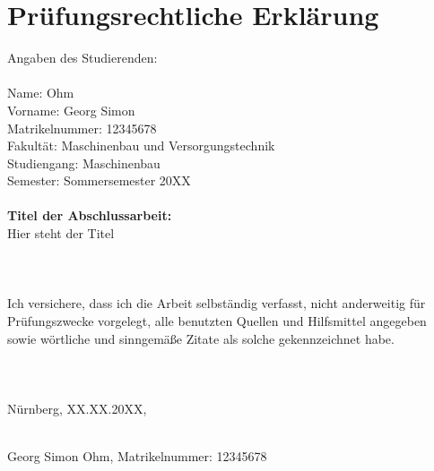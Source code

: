 \documentclass[captions=tableheading, listof=leveldown, 11pt]{scrartcl}
\newcommand{\titel}{Hier steht der Titel}
\newcommand{\autor}{Georg Simon Ohm}
\newcommand{\matrikelnr}{12345678}
\newcommand{\abgabe}{XX.XX.20XX}          %
\begin{document}
\section*{Prüfungsrechtliche Erklärung}
{Angaben des Studierenden:}\\\\
%
Name: Ohm\\
Vorname: Georg Simon\\
Matrikelnummer: \matrikelnr\\
Fakultät: Maschinenbau und Versorgungstechnik\\
Studiengang: Maschinenbau\\
Semester: Sommersemester 20XX\\\\
\textbf{Titel der Abschlussarbeit:}\\
\titel\\\\
\\\\
Ich versichere, dass ich die Arbeit selbständig verfasst, nicht anderweitig für Prüfungszwecke vorgelegt, alle benutzten Quellen und Hilfsmittel angegeben sowie wörtliche und sinngemäße Zitate als solche gekennzeichnet habe.\\\\\\\\
\hspace{50mm}
\vspace{15mm}
\noindent{}Nürnberg, \abgabe,
\begin{minipage}[t]{8cm}
\centering \dotfill \\
\autor, Matrikelnummer: \matrikelnr
\end{minipage}
%
\newpage
\end{document}
